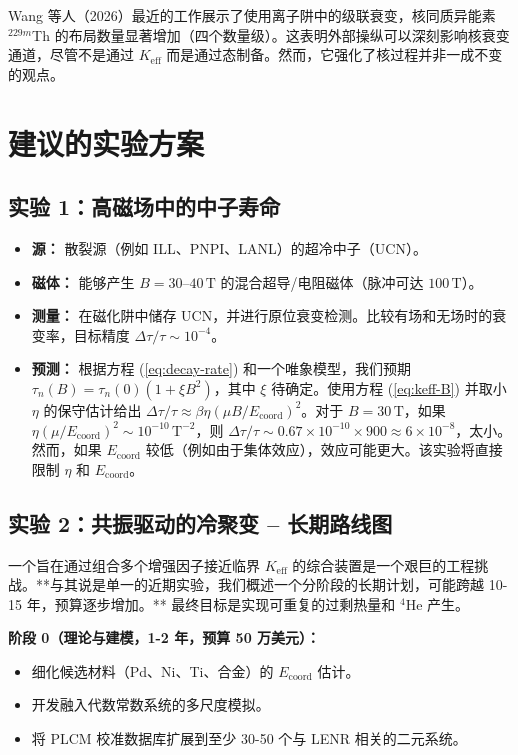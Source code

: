 \documentclass[12pt]{article}
\theoremstyle{remark}
\newcommand{\Keff}{K_{\mathrm{eff}}}
\begin{document}
	Wang 等人（2026）最近的工作展示了使用离子阱中的级联衰变，核同质异能素 \(^{229m}\)Th 的布局数量显著增加（四个数量级）。这表明外部操纵可以深刻影响核衰变通道，尽管不是通过 \(\Keff\) 而是通过态制备。然而，它强化了核过程并非一成不变的观点。
	
	\section{建议的实验方案}
	\label{sec:experiments}
	
	\subsection{实验 1：高磁场中的中子寿命}
	
	\begin{itemize}
		\item \textbf{源：} 散裂源（例如 ILL、PNPI、LANL）的超冷中子（UCN）。
		\item \textbf{磁体：} 能够产生 \(B = 30\)–\(40\,\text{T}\) 的混合超导/电阻磁体（脉冲可达 \(100\,\text{T}\)）。
		\item \textbf{测量：} 在磁化阱中储存 UCN，并进行原位衰变检测。比较有场和无场时的衰变率，目标精度 \(\Delta \tau / \tau \sim 10^{-4}\)。
		\item \textbf{预测：} 根据方程 (\ref{eq:decay-rate}) 和一个唯象模型，我们预期 \(\tau_n(B) = \tau_n(0) (1 + \xi B^2)\)，其中 \(\xi\) 待确定。使用方程 (\ref{eq:keff-B}) 并取小 \(\eta\) 的保守估计给出 \(\Delta \tau/\tau \approx \beta \eta (\mu B/E_{\mathrm{coord}})^2\)。对于 \(B = 30\,\text{T}\)，如果 \(\eta (\mu/E_{\mathrm{coord}})^2 \sim 10^{-10}\,\text{T}^{-2}\)，则 \(\Delta \tau/\tau \sim 0.67 \times 10^{-10} \times 900 \approx 6\times10^{-8}\)，太小。然而，如果 \(E_{\mathrm{coord}}\) 较低（例如由于集体效应），效应可能更大。该实验将直接限制 \(\eta\) 和 \(E_{\mathrm{coord}}\)。
	\end{itemize}
	
	\subsection{实验 2：共振驱动的冷聚变 – 长期路线图}
	
	一个旨在通过组合多个增强因子接近临界 \(\Keff\) 的综合装置是一个艰巨的工程挑战。**与其说是单一的近期实验，我们概述一个分阶段的长期计划，可能跨越 10-15 年，预算逐步增加。** 最终目标是实现可重复的过剩热量和 \(^4\)He 产生。
	
	\textbf{阶段 0（理论与建模，1-2 年，预算 50 万美元）：}
	\begin{itemize}
		\item 细化候选材料（Pd、Ni、Ti、合金）的 \(E_{\mathrm{coord}}\) 估计。
		\item 开发融入代数常数系统的多尺度模拟。
		\item 将 PLCM 校准数据库扩展到至少 30-50 个与 LENR 相关的二元系统。
	\end{itemize}
	
\end{document}
